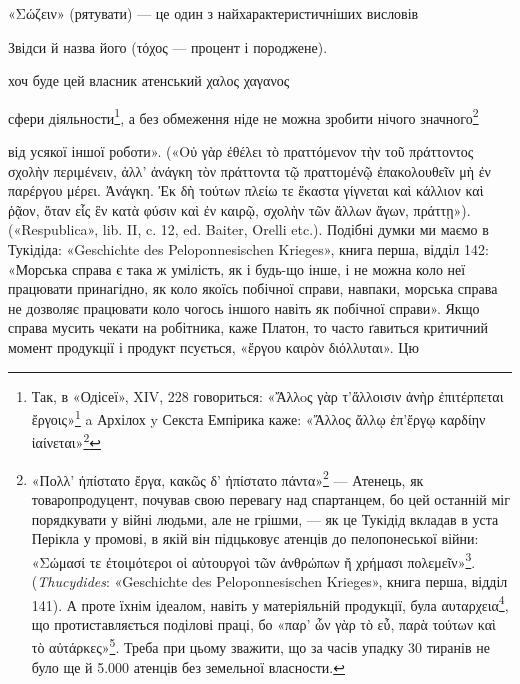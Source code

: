 \documentclass{kapital}
\begin{document}
«\textgreek{Σώζειν}» (рятувати) — це один з найхарактеристичніших висловів

Звідси й назва його (\textgreek{τόχος} — процент і породжене).

хоч буде цей власник атенський \textgreek{χαλος χαγανος}

сфери діяльности\footnote{
Так, в «Одісеї», XIV, 228 говориться: «\textgreek{Ἄλλoς γὰρ τ’ἄλλοισιν ἀνὴρ ἐπιτέρπεται ἔργοις}»\footnote*{
Одні люди люблять одне, інші — інше. \emph{Ред.}
} a Архілох y Секста Емпірика каже: «\textgreek{Ἄλλος ἄλλῳ ἐπ’ἔργῳ καρδίην ἰαίνεται}»\footnote*{
Одне тішить серце одного, інше — іншого. \emph{Ред.}
}}, а без обмеження ніде не можна зробити нічого
значного\footnote{
«\textgreek{Поλλ’ ἠπίστατο ἔργα, κακῶς δ’ ἠπίστατο πάντα}»\footnote*{
Багато знав він справ, та всі погано знав. \emph{Ред.}
} — Атенець, як товаропродуцент,
почував свою перевагу над спартанцем, бо цей останній міг
порядкувати у війні людьми, але не грішми, — як це Тукідід вкладав
в уста Перікла у промові, в якій він підцьковує атенців до пелопонеської
війни: «\textgreek{Σώμασί τε ἐτοιμότεροι οἱ αὐτουργοὶ τῶν ἀνθρώπων ἤ χρήμασι πολεμεῖν}»\footnote*{
Люди, що працюють для задоволення власних потреб, радше
віддадуть на війну свої тіла, ніж гроші. \emph{Ред.}
}. (\emph{Thucydides}:
«Geschichte des Peloponnesischen Krieges», книга перша, відділ
141). А проте їхнім ідеалом, навіть у матеріяльній продукції, була
\textgreek{αυταρχεια}\footnote*{
— автаркія. \emph{Ред.}
}, що протиставляється поділові праці, бо «\textgreek{παρ’ ὧν γὰρ τὸ εὖ, παρὰ τούτων καὶ τὸ
αὐτάρκες}»\footnote*{
«з цього постає благо, а з того і незалежність». \emph{Ред.}
}. Треба при цьому зважити, що за часів упадку
30 тиранів не було ще й \num{5.000} атенців без земельної власности.
}

від усякої іншої роботи». («\textgreek{Οὐ γὰρ ἐθέλει τὸ πραττόμενον τὴν τοῦ πράττοντος σχολὴν περιμένειν, ἀλλ’
ἀνάγκη τὸν πράττοντα τῷ πραττομένῷ ἐπακολουθεῖν μὴ ἐν παρέργου μέρει. \textemdash{} Ἀνάγκη. Ἐκ δὴ τούτων πλείω
τε ἕκαστα γίγνεται καὶ κάλλιον καὶ ῥᾷον, ὅταν εἷς ἓν κατὰ φύσιν καὶ ἐν καιρῷ, σχολὴν τῶν ἄλλων ἄγων,
πράττῃ»}). («Respublica», lib. II, c. 12,
ed. Baiter, Orelli etc.). Подібні думки ми маємо в Тукідіда: «Geschichte
des Peloponnesischen Krieges», книга перша, відділ 142: «Морська справа
є така ж умілість, як і будь-що інше, і не можна коло неї працювати принагідно,
як коло якоїсь побічної справи, навпаки, морська справа не
дозволяє працювати коло чогось іншого навіть як побічної справи».
Якщо справа мусить чекати на робітника, каже Платон, то часто ґавиться
критичний момент продукції і продукт псується, «\textgreek{ἔργου καιρὸν διόλλυται}». Цю
\end{document}
